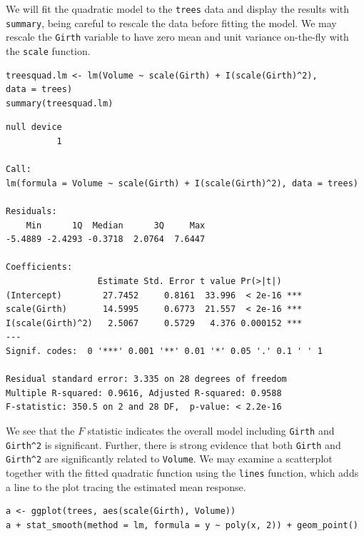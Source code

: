 \documentclass[captions=tableheading]{scrbook}
\begin{document}
\begin{example}
We will fit the quadratic model to the \texttt{trees} data and display the results with \texttt{summary}, being careful to rescale the data before fitting the model. We may rescale the \texttt{Girth} variable to have zero mean and unit variance on-the-fly with the \texttt{scale} function.


\begin{verbatim}
treesquad.lm <- lm(Volume ~ scale(Girth) + I(scale(Girth)^2),                    data = trees)
summary(treesquad.lm)
\end{verbatim}


\begin{verbatim}
null device 
          1
 
Call:
lm(formula = Volume ~ scale(Girth) + I(scale(Girth)^2), data = trees)

Residuals:
    Min      1Q  Median      3Q     Max 
-5.4889 -2.4293 -0.3718  2.0764  7.6447 

Coefficients:
                  Estimate Std. Error t value Pr(>|t|)    
(Intercept)        27.7452     0.8161  33.996  < 2e-16 ***
scale(Girth)       14.5995     0.6773  21.557  < 2e-16 ***
I(scale(Girth)^2)   2.5067     0.5729   4.376 0.000152 ***
---
Signif. codes:  0 '***' 0.001 '**' 0.01 '*' 0.05 '.' 0.1 ' ' 1 

Residual standard error: 3.335 on 28 degrees of freedom
Multiple R-squared: 0.9616,	Adjusted R-squared: 0.9588 
F-statistic: 350.5 on 2 and 28 DF,  p-value: < 2.2e-16
\end{verbatim}

We see that the \(F\) statistic indicates the overall model including \texttt{Girth} and \texttt{Girth\textasciicircum{}2} is significant. Further, there is strong evidence that both \texttt{Girth} and \texttt{Girth\textasciicircum{}2} are significantly related to \texttt{Volume}. We may examine a scatterplot together with the fitted quadratic function using the \texttt{lines} function, which adds a line to the plot tracing the estimated mean response.



\begin{verbatim}
a <- ggplot(trees, aes(scale(Girth), Volume))
a + stat_smooth(method = lm, formula = y ~ poly(x, 2)) + geom_point()
\end{verbatim}




\end{example}
\end{document}
